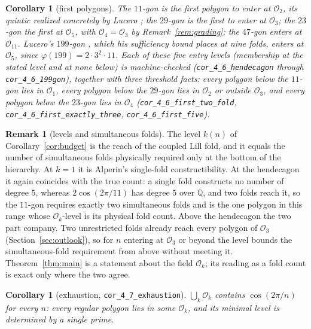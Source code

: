 \documentclass[11pt]{amsart}
\theoremstyle{plain}
\newtheorem{corollary}[theorem]{Corollary}
\theoremstyle{definition}
\newtheorem{remark}[theorem]{Remark}
\newcommand{\Ok}{\mathscr{O}_k}
\newcommand{\Onum}[1]{\mathscr{O}_{#1}}
\newcommand{\Q}{\mathbb{Q}}
\newcommand{\code}[1]{\texttt{#1}}
\begin{document}
\begin{corollary}[first polygons]\label{cor:first}
The $11$-gon is the first polygon to enter at $\Onum{2}$, its quintic realized concretely by Lucero \cite{luceroeleven}; the $29$-gon is the first to enter at $\Onum{3}$; the $23$-gon the first at $\Onum{5}$, with $\Onum{4} = \Onum{3}$ by Remark~\ref{rem:grading}; the $47$-gon enters at $\Onum{11}$. Lucero's $199$-gon \cite{lucero}, which his sufficiency bound places at nine folds, enters at $\Onum{5}$, since $\varphi(199) = 2 \cdot 3^2 \cdot 11$. Each of these five entry levels (membership at the stated level and at none below) is machine-checked (\code{cor\_4\_6\_hendecagon} through \code{cor\_4\_6\_199gon}), together with three threshold facts: every polygon below the $11$-gon lies in $\Onum{1}$, every polygon below the $29$-gon lies in $\Onum{2}$ or outside $\Onum{3}$, and every polygon below the $23$-gon lies in $\Onum{4}$ (\code{cor\_4\_6\_first\_two\_fold}, \code{cor\_4\_6\_first\_exactly\_three}, \code{cor\_4\_6\_first\_five}).
\end{corollary}

\begin{remark}[levels and simultaneous folds]\label{rem:physical}
The level $k(n)$ of Corollary~\ref{cor:budget} is the reach of the coupled Lill fold, and it equals the number of simultaneous folds physically required only at the bottom of the hierarchy. At $k=1$ it is Alperin's single-fold constructibility. At the hendecagon it again coincides with the true count: a single fold constructs no number of degree $5$, whereas $2\cos(2\pi/11)$ has degree $5$ over $\Q$, and two folds reach it, so the $11$-gon requires exactly two simultaneous folds and is the one polygon in this range whose $\Ok$-level is its physical fold count. Above the hendecagon the two part company. Two unrestricted folds already reach every polygon of $\Onum{3}$ (Section~\ref{sec:outlook}), so for $n$ entering at $\Onum{3}$ or beyond the level bounds the simultaneous-fold requirement from above without meeting it. Theorem~\ref{thm:main} is a statement about the field $\Ok$; its reading as a fold count is exact only where the two agree.
\end{remark}

\begin{corollary}[exhaustion, \code{cor\_4\_7\_exhaustion}]\label{cor:exhaust}
$\bigcup_k \Ok$ contains $\cos(2\pi/n)$ for every $n$: every regular polygon lies in some $\Ok$, and its minimal level is determined by a single prime.
\end{corollary}
\end{document}
